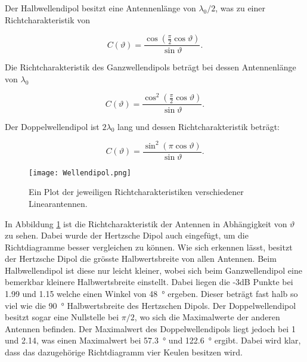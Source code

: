Der Halbwellendipol besitzt eine Antennenlänge von $\lambda_0/2$, was zu einer Richtcharakteristik von 

\begin{equation}\label{eq:RichtHalb}
C(\vartheta) = \frac{\cos \left(\frac{\pi}{2}\cos \vartheta \right)}{\sin \vartheta}.
\end{equation}

Die Richtcharakteristik des Ganzwellendipols beträgt bei dessen Antennenlänge von $\lambda_0$

\begin{equation}
C(\vartheta) = \frac{\cos^2 \left(\frac{\pi}{2}\cos \vartheta \right)}{\sin \vartheta}.
\end{equation}

Der Doppelwellendipol ist $2\lambda_0$ lang und dessen Richtcharakteristik beträgt:

\begin{equation}\label{eq:RichtDoppel}
C(\vartheta) = \frac{\sin^2 \left(\pi \cos \vartheta \right)}{\sin \vartheta}.
\end{equation}

\begin{figure}[!ht]
	\centering
    \texttt{[image: Wellendipol.png]}
    \caption{Ein Plot der jeweiligen Richtcharakteristiken verschiedener Linearantennen.}
    \label{fig:Wellendipol}
\end{figure}

In Abbildung \ref{fig:Wellendipol} ist die Richtcharakteristik der Antennen in Abhängigkeit von $\vartheta$ zu sehen. Dabei wurde der Hertzsche Dipol auch eingefügt, um die Richtdiagramme besser vergleichen zu können. Wie sich erkennen lässt, besitzt der Hertzsche Dipol die grösste Halbwertsbreite von allen Antennen. Beim Halbwellendipol ist diese nur leicht kleiner, wobei sich beim Ganzwellendipol eine bemerkbar kleinere Halbwertsbreite einstellt. Dabei liegen die -3dB Punkte bei \num{1.99} und \num{1.15} welche einen Winkel von \SI{48}{\degree} ergeben. Dieser beträgt fast halb so viel wie die \SI{90}{\degree} Halbwertsbreite des Hertzschen Dipols. Der Doppelwellendipol besitzt sogar eine Nullstelle bei $\pi/2$, wo sich die Maximalwerte der anderen Antennen befinden. Der Maximalwert des Doppelwellendipols liegt jedoch bei \num{1} und \num{2.14}, was einen Maximalwert bei \SI{57.3}{\degree} und \SI{122.6}{\degree} ergibt. Dabei wird klar, dass das dazugehörige Richtdiagramm vier Keulen besitzen wird.\\

